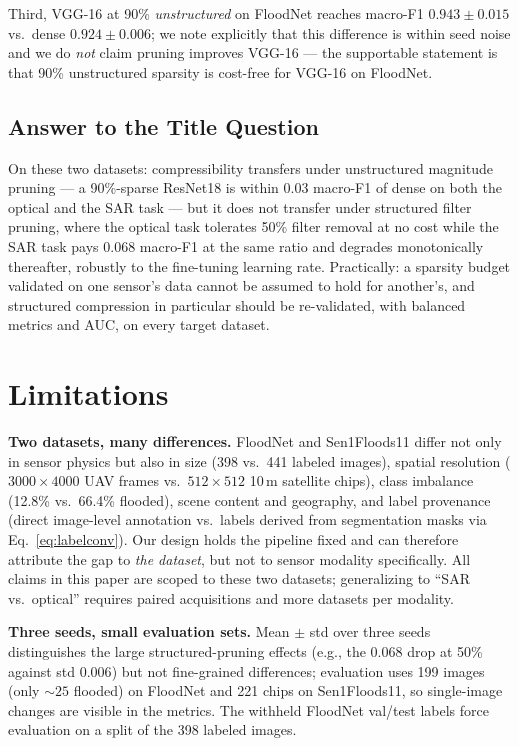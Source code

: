 \documentclass[conference]{IEEEtran}
\begin{document}
Third, VGG-16 at 90\% \emph{unstructured} on FloodNet reaches
macro-F1 $0.943\pm0.015$ vs.\ dense $0.924\pm0.006$; we note explicitly
that this difference is within seed noise and we do \emph{not} claim
pruning improves VGG-16 --- the supportable statement is that 90\%
unstructured sparsity is cost-free for VGG-16 on FloodNet.

\subsection{Answer to the Title Question}
On these two datasets: compressibility transfers under unstructured
magnitude pruning --- a 90\%-sparse ResNet18 is within $0.03$ macro-F1
of dense on both the optical and the SAR task --- but it does not
transfer under structured filter pruning, where the optical task
tolerates 50\% filter removal at no cost while the SAR task pays
$0.068$ macro-F1 at the same ratio and degrades monotonically
thereafter, robustly to the fine-tuning learning rate. Practically: a
sparsity budget validated on one sensor's data cannot be assumed to
hold for another's, and structured compression in particular should be
re-validated, with balanced metrics and AUC, on every target dataset.

\section{Limitations}
\label{sec:limitations}
\textbf{Two datasets, many differences.} FloodNet and Sen1Floods11
differ not only in sensor physics but also in size (398 vs.\ 441
labeled images), spatial resolution ($3000\times4000$ UAV frames vs.\
$512\times512$ 10\,m satellite chips), class imbalance (12.8\% vs.\
66.4\% flooded), scene content and geography, and label provenance
(direct image-level annotation vs.\ labels derived from segmentation
masks via Eq.~\eqref{eq:labelconv}). Our design holds the pipeline
fixed and can therefore attribute the gap to \emph{the dataset}, but
not to sensor modality specifically. All claims in this paper are
scoped to these two datasets; generalizing to ``SAR vs.\ optical''
requires paired acquisitions and more datasets per modality.

\textbf{Three seeds, small evaluation sets.} Mean $\pm$ std over three
seeds distinguishes the large structured-pruning effects (e.g., the
$0.068$ drop at 50\% against std $0.006$) but not fine-grained
differences; evaluation uses 199 images (only ${\sim}25$ flooded) on
FloodNet and
221 chips on Sen1Floods11, so single-image changes are visible in the
metrics. The withheld FloodNet val/test labels force evaluation on a
split of the 398 labeled images.
\end{document}
